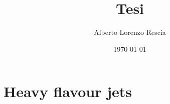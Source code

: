 \documentclass[10pt,a4paper]{book}
\title{Tesi}
\author{Alberto Lorenzo Rescia}
\date{\today}
\begin{document}
\tableofcontents






\chapter{Heavy flavour jets}





\end{document}
